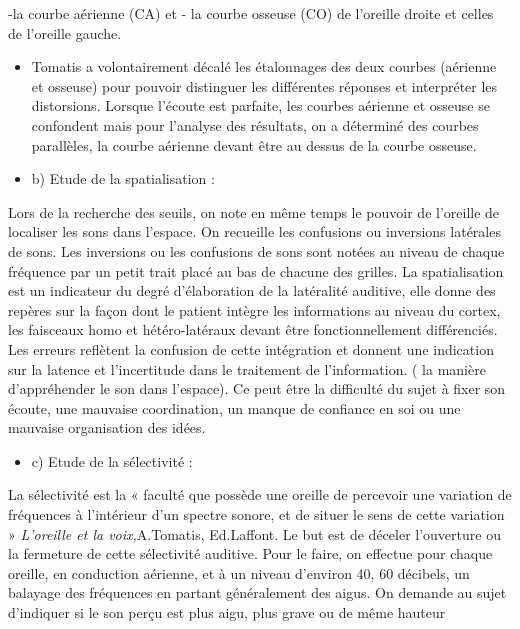 \documentclass[12pt,french]{report}
\makeatletter
\let\SF@@footnote\footnote
\def\footnote{\ifx\protect\@typeset@protect
    \expandafter\SF@@footnote
  \else
    \expandafter\SF@gobble@opt
  \fi
}
\edef\SF@gobble@opt{\noexpand\protect
  \expandafter\noexpand\csname SF@gobble@opt \endcsname}
\makeatother
\begin{document}
-la courbe aérienne (CA) et - la courbe osseuse (CO) de l'oreille
droite et celles de l'oreille gauche.

\footnote{\begin{itemize}
\item Tomatis a volontairement décalé les étalonnages des deux courbes (aérienne
et osseuse) pour pouvoir distinguer les différentes réponses et interpréter
les distorsions. Lorsque l\textquoteright écoute est parfaite, les
courbes aérienne et osseuse se confondent mais pour l'analyse des
résultats, on a déterminé des courbes parallèles, la courbe aérienne
devant être au dessus de la courbe osseuse.
\end{itemize}
}
\begin{itemize}
\item b) Etude de la spatialisation :
\end{itemize}
Lors de la recherche des seuils, on note en même temps le pouvoir
de l'oreille de localiser les sons dans l'espace. On recueille les
confusions ou inversions latérales de sons. Les inversions ou les
confusions de sons sont notées au niveau de chaque fréquence par un
petit trait placé au bas de chacune des grilles. La spatialisation
est un indicateur du degré d'élaboration de la latéralité auditive,
elle donne des repères sur la façon dont le patient intègre les informations
au niveau du cortex, les faisceaux homo et hétéro-latéraux devant
être fonctionnellement différenciés. Les erreurs reflètent la confusion
de cette intégration et donnent une indication sur la latence et l'incertitude
dans le traitement de l'information. ( la manière d'appréhender le
son dans l'espace). Ce peut être la difficulté du sujet à fixer son
écoute, une mauvaise coordination, un manque de confiance en soi ou
une mauvaise organisation des idées.
\begin{itemize}
\item c) Etude de la sélectivité : 
\end{itemize}
La sélectivité est la « faculté que possède une oreille de percevoir
une variation de fréquences à l'intérieur d'un spectre sonore, et
de situer le sens de cette variation »\footnote{\emph{L'oreille et la voix,}A.Tomatis, Ed.Laffont}.
Le but est de déceler l'ouverture ou la fermeture de cette sélectivité
auditive. Pour le faire, on effectue pour chaque oreille, en conduction
aérienne, et à un niveau d'environ 40, 60 décibels, un balayage des
fréquences en partant généralement des aigus. On demande au sujet
d'indiquer si le son perçu est plus aigu, plus grave ou de même hauteur
\end{document}
